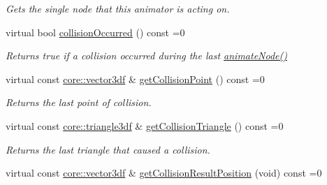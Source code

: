 \begin{DoxyCompactItemize}
\begin{DoxyCompactList}\small\item\em Gets the single node that this animator is acting on. \end{DoxyCompactList}\item 
\mbox{\label{classirr_1_1scene_1_1ISceneNodeAnimatorCollisionResponse_a8bb04bc4d7de2203879a8392d024f466}} 
virtual bool \hyperlink{classirr_1_1scene_1_1ISceneNodeAnimatorCollisionResponse_a8bb04bc4d7de2203879a8392d024f466}{collision\+Occurred} () const =0
\begin{DoxyCompactList}\small\item\em Returns true if a collision occurred during the last \hyperlink{classirr_1_1scene_1_1ISceneNodeAnimator_ab2170d133db16de148d0f6841c06bc84}{animate\+Node()} \end{DoxyCompactList}\item 
\mbox{\label{classirr_1_1scene_1_1ISceneNodeAnimatorCollisionResponse_acb39b68d18f721960ac73dc158968479}} 
virtual const \hyperlink{namespaceirr_1_1core_ae6e2b2a6c552833ebbd5b7463d03586b}{core\+::vector3df} \& \hyperlink{classirr_1_1scene_1_1ISceneNodeAnimatorCollisionResponse_acb39b68d18f721960ac73dc158968479}{get\+Collision\+Point} () const =0
\begin{DoxyCompactList}\small\item\em Returns the last point of collision. \end{DoxyCompactList}\item 
\mbox{\label{classirr_1_1scene_1_1ISceneNodeAnimatorCollisionResponse_abb9d0576446a64e9944ef15a04722591}} 
virtual const \hyperlink{namespaceirr_1_1core_a8983bda2678a7a67d97bf3c7be6c31c7}{core\+::triangle3df} \& \hyperlink{classirr_1_1scene_1_1ISceneNodeAnimatorCollisionResponse_abb9d0576446a64e9944ef15a04722591}{get\+Collision\+Triangle} () const =0
\begin{DoxyCompactList}\small\item\em Returns the last triangle that caused a collision. \end{DoxyCompactList}\item 
virtual const \hyperlink{namespaceirr_1_1core_ae6e2b2a6c552833ebbd5b7463d03586b}{core\+::vector3df} \& \hyperlink{classirr_1_1scene_1_1ISceneNodeAnimatorCollisionResponse_a788542083dda874c63e278891535a9f4}{get\+Collision\+Result\+Position} (void) const =0

\end{DoxyCompactItemize}
